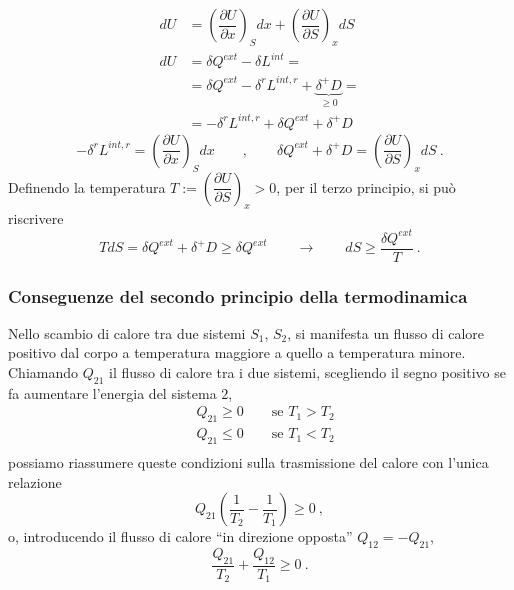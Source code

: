 \begin{equation}
\begin{aligned}
  d U & = \left(\dfrac{\partial U}{\partial x}\right)_S dx + \left(\dfrac{\partial U}{\partial S}\right)_x dS \\
  d U & = \delta Q^{ext} - \delta L^{int} = \\
      & = \delta Q^{ext} - \delta^r L^{int,r} + \underbrace{\delta^+ D}_{\ge 0} = \\
      & = -\delta^r L^{int,r} + \delta Q^{ext} + \delta^+ D 
\end{aligned}
\end{equation}
\begin{equation}
  - \delta^r L^{int,r} =  \left(\dfrac{\partial U}{\partial x}\right)_S dx
\qquad , \qquad
  \delta Q^{ext} + \delta^+ D = \left(\dfrac{\partial U}{\partial S}\right)_x dS \ .
\end{equation}
Definendo la temperatura $T := \left(\dfrac{\partial U}{\partial S}\right)_x > 0$, per il terzo principio, si può riscrivere 
\begin{equation}
  T dS = \delta Q^{ext} + \delta^+ D \ge \delta Q^{ext} \qquad \rightarrow \qquad dS \ge \dfrac{\delta Q^{ext}}{T} \ .
\end{equation}

\subsubsection{Conseguenze del secondo principio della termodinamica}
Nello scambio di calore tra due sistemi $S_1$, $S_2$, si manifesta un flusso di calore positivo dal corpo a temperatura maggiore a quello a temperatura minore. Chiamando $Q_{21}$ il flusso di calore tra i due sistemi, scegliendo il segno positivo se fa aumentare l'energia del sistema $2$,
\begin{equation}
\begin{aligned}
    &  Q_{21} \ge 0 \qquad \text{se $T_1 > T_2$} \\ 
    &  Q_{21} \le 0 \qquad \text{se $T_1 < T_2$} \\ 
\end{aligned}
\end{equation}
possiamo riassumere queste condizioni sulla trasmissione del calore con l'unica relazione
\begin{equation}
    Q_{21} \left( \dfrac{1}{T_2} - \dfrac{1}{T_1} \right) \ge 0 \ ,
\end{equation}
o, introducendo il flusso di calore ``in direzione opposta'' $Q_{12} = -Q_{21}$,
\begin{equation}
    \dfrac{Q_{21}}{T_2} + \dfrac{Q_{12}}{T_1} \ge 0 \ .
\end{equation}

